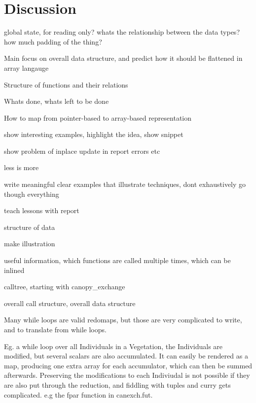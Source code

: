 \section{Discussion}
global state, for reading only?
whats the relationship between the data types?
how much padding of the thing?

Main focus on overall data structure, and predict how it should be flattened in array langauge

Structure of functions and their relations

Whats done, whats left to be done

How to map from pointer-based to array-based representation

show interesting examples, highlight the idea, show snippet

show problem of inplace update in report
  errors etc

less is more

write meaningful clear examples that illustrate techniques, dont exhaustively go though everything

teach lessons with report

structure of data

make illustration

useful information, which functions are called multiple times, which can be inlined

calltree, starting with canopy_exchange

overall call structure, overall data structure




Many while loops are valid redomaps, but those are very complicated to write, and to translate from while loops.

Eg. a while loop over all Individuals in a Vegetation, the Individuals are modified, but several scalars are also accumulated. It can easily be rendered as a map, producing one extra array for each accumulator, which can then be summed afterwards. Preserving the modifications to each Indiviudal is not  possible if they are also put through the reduction, and fiddling with tuples and curry gets complicated. e.g the fpar function in canexch.fut.
